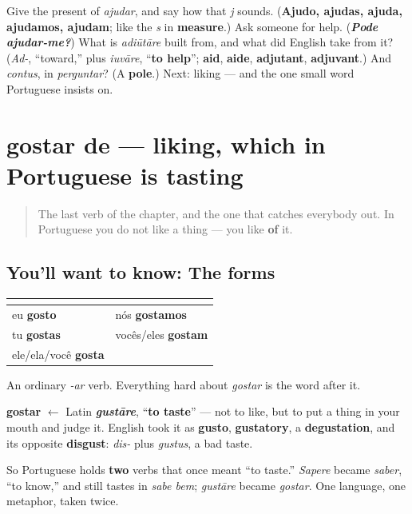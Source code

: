 \begin{tcolorbox}[breakable,colback=teal!4,colframe=teal!35!black,title={Before you move on}]
Give the present of \emph{ajudar}, and say how that \emph{j} sounds. (\textbf{Ajudo, ajudas, ajuda, ajudamos, ajudam}; like the \emph{s} in \textbf{measure}.) Ask someone for help. (\emph{\textbf{Pode ajudar-me?}}) What is \emph{adiūtāre} built from, and what did English take from it? (\emph{Ad-}, \textquotedblleft{}toward,\textquotedblright{} plus \emph{iuvāre}, \textquotedblleft{}\textbf{to help}\textquotedblright{}; \textbf{aid}, \textbf{aide}, \textbf{adjutant}, \textbf{adjuvant}.) And \emph{contus}, in \emph{perguntar}? (A \textbf{pole}.) Next: liking — and the one small word Portuguese insists on.
\end{tcolorbox}
\section[gostar de]{gostar de — liking, which in Portuguese is tasting}

\label{lesson:PT-C20-gostar}



\begin{quote}
The last verb of the chapter, and the one that catches everybody out. In Portuguese you do not like a thing — you like \textbf{of} it.
\end{quote}

\subsection*{You'll want to know: The forms}
\noindent
\begin{tabularx}{\linewidth}{@{}>{\raggedright\arraybackslash}X>{\raggedright\arraybackslash}X@{}}
\toprule
\textbf{} & \textbf{} \\
\midrule
eu \textbf{gosto} & nós \textbf{gostamos} \\
tu \textbf{gostas} & vocês/eles \textbf{gostam} \\
ele/ela/você \textbf{gosta} &  \\
\bottomrule
\end{tabularx}

An ordinary \emph{-ar} verb. Everything hard about \emph{gostar} is the word after it.

\begin{cousinweb}
\textbf{gostar} $\leftarrow$ Latin \emph{\textbf{gustāre}}, \textquotedblleft{}\textbf{to taste}\textquotedblright{} — not to like, but to put a thing in your mouth and judge it. English took it as \textbf{gusto}, \textbf{gustatory}, a \textbf{degustation}, and its opposite \textbf{disgust}: \emph{dis-} plus \emph{gustus}, a bad taste.

So Portuguese holds \textbf{two} verbs that once meant \textquotedblleft{}to taste.\textquotedblright{} \emph{Sapere} became \emph{saber}, \textquotedblleft{}to know,\textquotedblright{} and still tastes in \emph{sabe bem}; \emph{gustāre} became \emph{gostar}. One language, one metaphor, taken twice.
\end{cousinweb}

